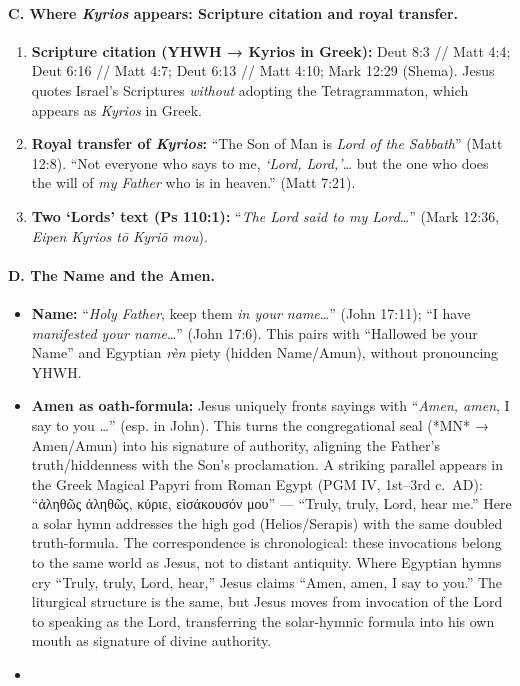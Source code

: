 \paragraph{C. Where \emph{Kyrios} appears: Scripture citation and royal transfer.}
\begin{enumerate}
    \item \textbf{Scripture citation (YHWH → Kyrios in Greek):} Deut 8:3 // Matt 4:4; Deut 6:16 // Matt 4:7; Deut 6:13 // Matt 4:10; Mark 12:29 (Shema). Jesus quotes Israel’s Scriptures \emph{without} adopting the Tetragrammaton, which appears as \emph{Kyrios} in Greek.
    \item \textbf{Royal transfer of \emph{Kyrios}:} “The Son of Man is \emph{Lord of the Sabbath}” (Matt 12:8). “Not everyone who says to me, \emph{‘Lord, Lord,’}… but the one who does the will of \emph{my Father} who is in heaven.” (Matt 7:21).
    \item \textbf{Two ‘Lords’ text (Ps 110:1):} “\emph{The Lord said to my Lord}…” (Mark 12:36, \emph{Eipen Kyrios tō Kyriō mou}).
\end{enumerate}

\paragraph{D. The Name and the Amen.}
\begin{itemize}
    \item \textbf{Name:} “\emph{Holy Father}, keep them \emph{in your name}…” (John 17:11); “I have \emph{manifested your name}…” (John 17:6). This pairs with “Hallowed be your Name” and Egyptian \emph{r\`en} piety (hidden Name/Amun), without pronouncing YHWH.
    \item \textbf{Amen as oath-formula:} Jesus uniquely fronts sayings with “\emph{Amen, amen}, I say to you …” (esp. in John). This turns the congregational seal (*MN* → Amen/Amun) into his signature of authority, aligning the Father’s truth/hiddenness with the Son’s proclamation. A striking parallel appears in the Greek Magical Papyri from Roman Egypt (PGM IV, 1st–3rd c.~AD): “ἀληθῶς ἀληθῶς, κύριε, εἰσάκουσόν μου” — “Truly, truly, Lord, hear me.” Here a solar hymn addresses the high god (Helios/Serapis) with the same doubled truth-formula. The correspondence is chronological: these invocations belong to the same world as Jesus, not to distant antiquity. Where Egyptian hymns cry “Truly, truly, Lord, hear,” Jesus claims “Amen, amen, I say to you.” The liturgical structure is the same, but Jesus moves from invocation of the Lord to speaking as the Lord, transferring the solar-hymnic formula into his own mouth as signature of divine authority.
    \item \end{itemize}

